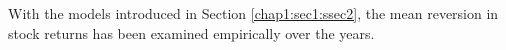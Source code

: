 With the models introduced in Section \ref{chap1:sec1:ssec2}, the mean reversion in stock returns
has been examined empirically over the years. 